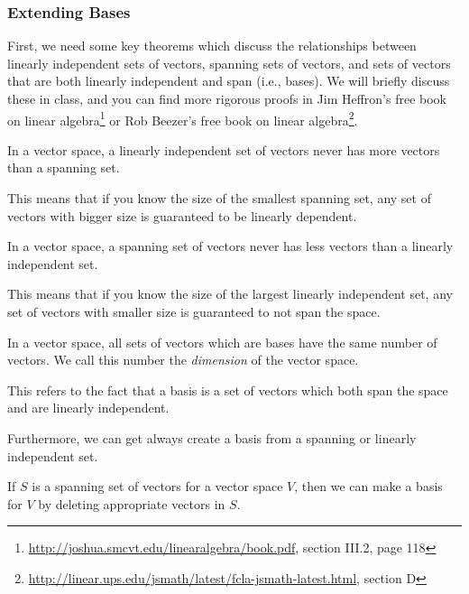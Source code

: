 
\subsubsection{Extending Bases}
\label{sec:extending-bases}

First, we need some key theorems which discuss the relationships between linearly independent sets of vectors, spanning sets of vectors, and sets of vectors that are both linearly independent and span (i.e., bases).  We will briefly discuss these in class, and you can find more rigorous proofs in Jim Heffron's free book on linear algebra\footnote{\url{http://joshua.smcvt.edu/linearalgebra/book.pdf}, section III.2, page 118} or Rob Beezer's free book on linear algebra\footnote{\url{http://linear.ups.edu/jsmath/latest/fcla-jsmath-latest.html}, section D}.

\begin{theorem}
  In a vector space, a linearly independent set of vectors never
  has more vectors than a spanning set.
\end{theorem}

This means that if you know the size of the smallest spanning set, any set of vectors with bigger size is guaranteed to be linearly dependent.

\begin{theorem}
  In a vector space, a spanning set of vectors never has less vectors
  than a linearly independent set.
\end{theorem}

This means that if you know the size of the largest linearly independent set, any set of vectors with smaller size is guaranteed to not span the space.

\begin{theorem}
  In a vector space, all sets of vectors which are bases have the same number of vectors.  We call this number the \emph{dimension} of the vector space.
\end{theorem}

This refers to the fact that a basis is a set of vectors which both span the space and are linearly independent.

Furthermore, we can get always create a basis from a spanning or linearly independent set.

\begin{theorem}
  If $S$ is a spanning set of vectors for a vector space $V$, then we can make a basis for $V$ by deleting appropriate vectors in $S$.
\end{theorem}

